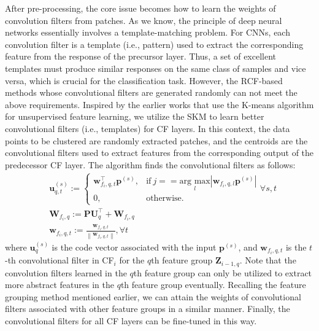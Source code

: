 \documentclass[lettersize,journal]{IEEEtran}
\begin{document}
After pre-processing, the core issue becomes how to learn the weights of convolution filters from patches. As we know, the principle of deep neural networks essentially involves a template-matching problem. For CNNs, each convolution filter is a template (i.e., pattern) used to extract the corresponding feature from the response of the precursor layer. Thus, a set of excellent templates must produce similar responses on the same class of samples and vice versa, which is crucial for the classification task. However, the RCF-based methods\cite{chen2018universal, yang2018cnn, yu2019broad, chen2020cnn, tang2020combining, ma2021multiscale} whose convolutional filters are generated randomly can not meet the above requirements. Inspired by the earlier works that use the K-means algorithm for unsupervised feature learning\cite{coates2011analysis, coates2012learning, coates2011selecting, culurciello2013analysis, dundar2015convolutional}, we utilize the  
SKM to learn better convolutional filters (i.e., templates) for CF layers. 
In this context, the data points to be clustered are randomly extracted patches, and the centroids are the convolutional filters used to extract features from the corresponding output of the predecessor CF layer. The algorithm finds the convolutional filters as follows:
\begin{equation}
\label{k-means}
\begin{aligned}
    &\bm{u}^{(s)}_{q,t}:=\begin{cases}
    \bm{w} _{f_i,q,t}^{\top}\bm{p}^{(s)} , &{\text{if}}\ {j == \underset {l} {\text{arg max}} \left | \bm{w} _{f_i,q,l}\bm{p}^{(s)} \right | } \\
    {0,}&{\text{otherwise.}}
    \end{cases} \forall s,t\\
    &\bm{W} _{f_i,q}:=\bm{P}\bm{U}_q ^{\top}+\bm{W} _{f_i,q}\\
    &\bm{w} _{f_i,q,t}:=\frac{\bm{w} _{f_i,q,t}}{\left \| \bm{w} _{f_i,q,t} \right \|}, \forall t
\end{aligned}
\end{equation}
where $\bm{u}^{(s)}_q$ is the code vector associated with the input $\bm{p}^{(s)}$, and $\bm{w} _{f_i,q,t}$ is the $t$-th convolutional filter in CF$_i$ for the $q$th feature group $\bm{Z}_{i-1,q}$. Note that the convolution filters learned in the $q$th feature group can only be utilized to extract more abstract features in the $q$th feature group eventually. Recalling the feature grouping method mentioned earlier, we can attain the weights of convolutional filters associated with other feature groups in a similar manner. Finally, the convolutional filters for all CF layers can be fine-tuned in this way.
\end{document}
